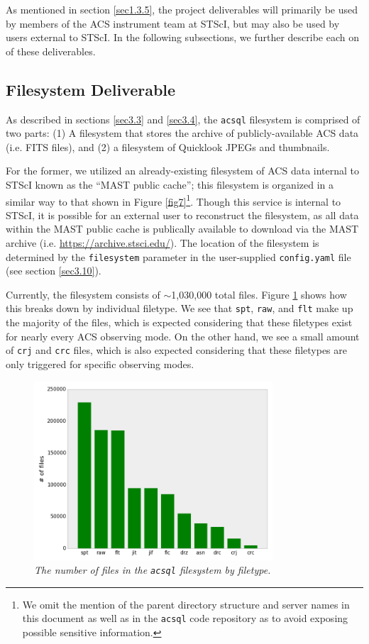 \documentclass[10pt,journal,compsoc]{IEEEtran}
\begin{document}
As mentioned in section \ref{sec1.3.5}, the project deliverables will primarily be used by members of the ACS instrument team at STScI, but may also be used by users external to STScI.
In the following subsections, we further describe each on of these deliverables.


\subsection{Filesystem Deliverable} \label{sec4.1}

As described in sections \ref{sec3.3} and \ref{sec3.4}, the \texttt{acsql} filesystem is comprised of two parts: (1) A filesystem that stores the archive of publicly-available ACS data (i.e.
FITS files), and (2) a filesystem of Quicklook JPEGs and thumbnails.

For the former, we utilized an already-existing filesystem of ACS data internal to STScI known as the ``MAST public cache''; this filesystem is organized in a similar way to that shown in
Figure \ref{fig7}\footnote{We omit the mention of the parent directory structure and server names in this document as well as in the \texttt{acsql} code repository as to avoid exposing possible
sensitive information.}.  Though this service is internal to STScI, it is possible for an external user to reconstruct the filesystem, as all data within the MAST public cache is publically available
to download via the MAST archive (i.e. \textcolor{blue}{\url{https://archive.stsci.edu/}}).  The location of the filesystem is determined by the \texttt{filesystem} parameter in the user-supplied
\texttt{config.yaml} file (see section \ref{sec3.10}).

Currently, the filesystem consists of $\sim$1,030,000 total files. Figure \ref{fig29} shows how this breaks down by individual filetype.  We see that \texttt{spt}, \texttt{raw}, and \texttt{flt}
make up the majority of the files, which is expected considering that these filetypes exist for nearly every ACS observing mode.  On the other hand, we see a small amount of \texttt{crj} and
\texttt{crc} files, which is also expected considering that these filetypes are only triggered for specific observing modes.

\begin{figure}[!h]
\centering
\includegraphics[width=3.5in]{./figures/num_files_by_filetype.png}
\caption{\textit{The number of files in the \texttt{acsql} filesystem by filetype.}}
\label{fig29}
\end{figure}
\end{document}

